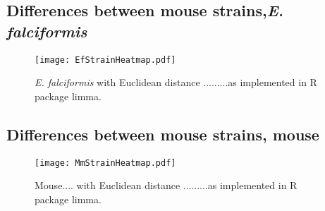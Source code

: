 \documentclass{article}
\begin{document}
\subsection{Differences between mouse strains,\textit{E. falciformis}}
\begin{figure}[H]
\begin{center}
\texttt{[image: EfStrainHeatmap.pdf]}  
	\caption{\textit{E. falciformis} with Euclidean distance .........as implemented in R package limma.}
\end{center}
\end{figure}

\subsection{Differences between mouse strains, mouse}
\begin{figure}[H]
\begin{center}
\texttt{[image: MmStrainHeatmap.pdf]}  
	\caption{Mouse.... with Euclidean distance .........as implemented in R package limma.}
\end{center}
\end{figure}
\end{document}
